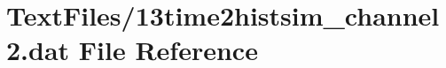 \hypertarget{13time2histsim__channel2_8dat}{}\section{Text\+Files/13time2histsim\+\_\+channel2.dat File Reference}
\label{13time2histsim__channel2_8dat}
